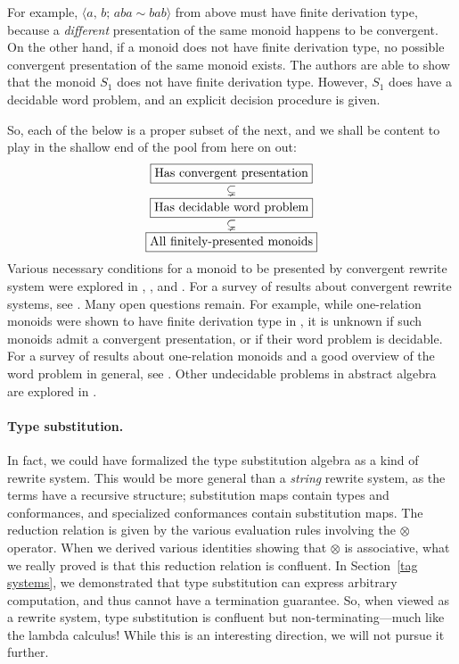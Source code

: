 \documentclass[../generics]{subfiles}
\begin{document}
For example, $\langle a,\,b;\,aba\sim bab\rangle$ from above must have finite derivation type, because a \emph{different} presentation of the same monoid happens to be convergent. On the other hand, if a monoid does not have finite derivation type, no possible convergent presentation of the same monoid exists. The authors are able to show that the monoid $S_1$ does not have finite derivation type. However, $S_1$ does have a decidable word problem, and an explicit decision procedure is given.

So, each of the below is a proper subset of the next, and we shall be content to play in the shallow end of the pool from here on out:
\[
\begin{array}{c}
\boxed{\hbox{Has convergent presentation}} \\
\subsetneq \\
\boxed{\hbox{Has decidable word problem}} \\
\subsetneq \\
\boxed{\hbox{All finitely-presented monoids}}
\end{array}
\]
Various necessary conditions for a monoid to be presented by convergent rewrite system were explored in \cite{fptype}, \cite{fdtfp3}, and \cite{mild}. For a survey of results about convergent rewrite systems, see \cite{Otto1997}. Many open questions remain. For example, while one-relation monoids were shown to have finite derivation type in \cite{KOBAYASHI2000547}, it is unknown if such monoids admit a convergent presentation, or if their word problem is decidable. For a survey of results about one-relation monoids and a good overview of the word problem in general, see \cite{onerelation}. Other undecidable problems in abstract algebra are explored in \cite{tarski1953undecidable}.

\paragraph{Type substitution.} In fact, we could have formalized the type substitution algebra as a kind of rewrite system. This would be more general than a \emph{string} rewrite system, as the terms have a recursive structure; substitution maps contain types and conformances, and specialized conformances contain substitution maps. The reduction relation is given by the various evaluation rules involving the $\otimes$ operator. When we derived various identities showing that $\otimes$ is associative, what we really proved is that this reduction relation is confluent. In Section~\ref{tag systems}, we demonstrated that type substitution can express arbitrary computation, and thus cannot have a termination guarantee. So, when viewed as a rewrite system, type substitution is confluent but non-terminating---much like the lambda calculus! While this is an interesting direction, we will not pursue it further.
\end{document}
